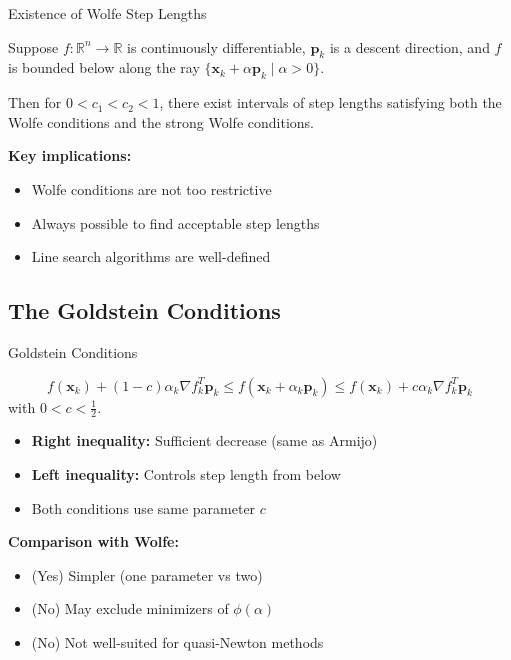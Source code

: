 \documentclass[aspectratio=1610]{beamer}
\begin{document}
\begin{frame}{Existence of Wolfe Step Lengths}
  \begin{theorem}
    Suppose $f: \mathbb{R}^n \to \mathbb{R}$ is continuously differentiable, $\mathbf{p}_k$ is a descent direction, and $f$ is bounded below along the ray $\{\mathbf{x}_k + \alpha \mathbf{p}_k \mid \alpha > 0\}$. 
    
    Then for $0 < c_1 < c_2 < 1$, there exist intervals of step lengths satisfying both the Wolfe conditions and the strong Wolfe conditions.
  \end{theorem}
  
  \vspace{0.3cm}
  
  \textbf{Key implications:}
  \begin{itemize}
    \item Wolfe conditions are not too restrictive
    \item Always possible to find acceptable step lengths
    \item Line search algorithms are well-defined
  \end{itemize}
\end{frame}

\subsection{The Goldstein Conditions}

\begin{frame}{Goldstein Conditions}
  \begin{definition}
    $$f(\mathbf{x}_k) + (1-c)\alpha_k \nabla f_k^T \mathbf{p}_k \leq f(\mathbf{x}_k + \alpha_k \mathbf{p}_k) \leq f(\mathbf{x}_k) + c\alpha_k \nabla f_k^T \mathbf{p}_k$$
    with $0 < c < \frac{1}{2}$.
  \end{definition}
  
  \vspace{0.3cm}
  
  \begin{itemize}
    \item \textbf{Right inequality:} Sufficient decrease (same as Armijo)
    \item \textbf{Left inequality:} Controls step length from below
    \item Both conditions use same parameter $c$
  \end{itemize}
  
  \vspace{0.3cm}
  
  \textbf{Comparison with Wolfe:}
  \begin{itemize}
    \item (Yes) Simpler (one parameter vs two)
    \item (No) May exclude minimizers of $\phi(\alpha)$
    \item (No) Not well-suited for quasi-Newton methods
  \end{itemize}
\end{frame}
\end{document}
